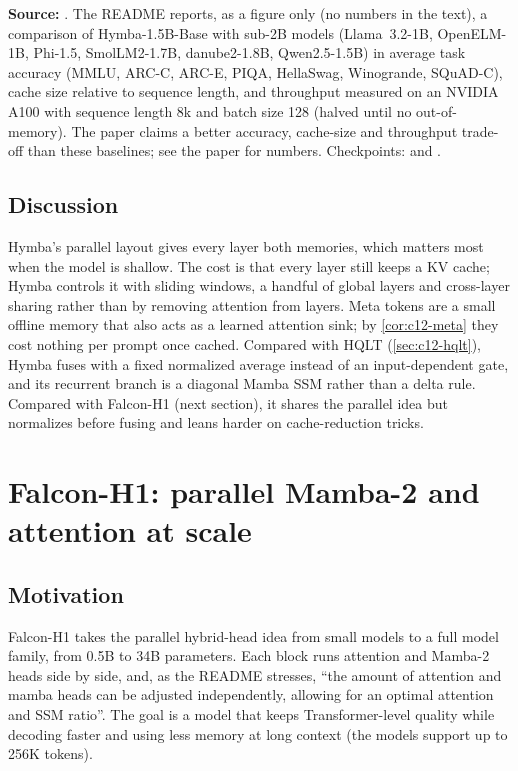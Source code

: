 \begin{results}
\textbf{Source:} . The README reports, as a figure only
(no numbers in the text), a comparison of Hymba-1.5B-Base with sub-2B models (Llama~3.2-1B,
OpenELM-1B, Phi-1.5, SmolLM2-1.7B, danube2-1.8B, Qwen2.5-1.5B) in average task accuracy (MMLU,
ARC-C, ARC-E, PIQA, HellaSwag, Winogrande, SQuAD-C), cache size relative to sequence length, and
throughput measured on an NVIDIA A100 with sequence length 8k and batch size 128 (halved until no
out-of-memory). The paper claims a better accuracy, cache-size and throughput trade-off than
these baselines; see the paper for numbers. Checkpoints:  and
.
\end{results}

\subsection{Discussion}

Hymba's parallel layout gives every layer both memories, which matters most when the model is
shallow. The cost is that every layer still keeps a KV cache; Hymba controls it with sliding
windows, a handful of global layers and cross-layer sharing rather than by removing attention
from layers. Meta tokens are a small offline memory that also acts as a learned attention sink;
by \cref{cor:c12-meta} they cost nothing per prompt once cached. Compared with HQLT
(\cref{sec:c12-hqlt}), Hymba fuses with a fixed normalized average instead of an input-dependent
gate, and its recurrent branch is a diagonal Mamba SSM rather than a delta rule. Compared with
Falcon-H1 (next section), it shares the parallel idea but normalizes before fusing and leans
harder on cache-reduction tricks.
\section{Falcon-H1: parallel Mamba-2 and attention at scale}\label{sec:c12-falcon}

\subsection{Motivation}

Falcon-H1 \citep{zuo2025falconh1} takes the parallel hybrid-head idea from small models to a
full model family, from 0.5B to 34B parameters. Each block runs attention and Mamba-2 heads side
by side, and, as the README stresses, ``the amount of attention and mamba heads can be adjusted
independently, allowing for an optimal attention and SSM ratio''. The goal is a model that keeps
Transformer-level quality while decoding faster and using less memory at long context (the
models support up to 256K tokens).

